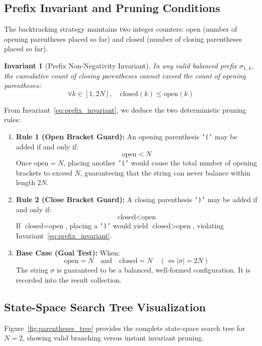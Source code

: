 \documentclass[10pt,journal,compsoc,onecolumn]{IEEEtran}
\newtheorem{invariant}[theorem]{Invariant}
\begin{document}
\subsection{Prefix Invariant and Pruning Conditions}
The backtracking strategy maintains two integer counters: $\text{open}$ (number of opening parentheses placed so far) and $\text{closed}$ (number of closing parentheses placed so far).

\begin{invariant}[Prefix Non-Negativity Invariant]
In any valid balanced prefix $\sigma_{1..k}$, the cumulative count of closing parentheses cannot exceed the count of opening parentheses:
\begin{equation}
\forall k \in [1, 2N], \quad \text{closed}(k) \le \text{open}(k)
\label{eq:prefix_invariant}
\end{equation}
\end{invariant}

From Invariant~\ref{eq:prefix_invariant}, we deduce the two deterministic pruning rules:
\begin{enumerate}
    \item \textbf{Rule 1 (Open Bracket Guard):} An opening parenthesis \texttt{'('} may be added if and only if:
    \begin{equation}
    \text{open} < N
    \end{equation}
    Once $\text{open} = N$, placing another \texttt{'('} would cause the total number of opening brackets to exceed $N$, guaranteeing that the string can never balance within length $2N$.
    \item \textbf{Rule 2 (Close Bracket Guard):} A closing parenthesis \texttt{')'} may be added if and only if:
    \begin{equation}
    \text{closed} < \text{open}
    \end{equation}
    If $\text{closed} = \text{open}$, placing a \texttt{')'} would yield $\text{closed} > \text{open}$, violating Invariant~\ref{eq:prefix_invariant}.
    \item \textbf{Base Case (Goal Test):} When:
    \begin{equation}
    \text{open} = N \quad \text{and} \quad \text{closed} = N \quad (\iff |\sigma| = 2N)
    \end{equation}
    The string $\sigma$ is guaranteed to be a balanced, well-formed configuration. It is recorded into the result collection.
\end{enumerate}

\subsection{State-Space Search Tree Visualization}
Figure~\ref{fig:parentheses_tree} provides the complete state-space search tree for $N = 2$, showing valid branching versus instant invariant pruning.
\end{document}
